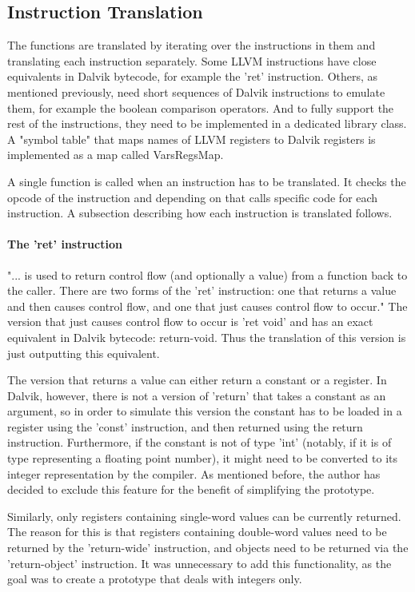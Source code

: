 \documentclass[parskip]{cs4rep}
\begin{document}
\subsection{Instruction Translation} \label{sec:instructionTranslation}

The functions are translated by iterating over the instructions in them and translating each instruction separately. Some LLVM instructions have close equivalents in Dalvik bytecode, for example the 'ret' instruction. Others, as mentioned previously, need short sequences of Dalvik instructions to emulate them, for example the boolean comparison operators. And to fully support the rest of the instructions, they need to be implemented in a dedicated library class. A "symbol table" that maps names of LLVM registers to Dalvik registers is implemented as a map called VarsRegsMap. 

A single function is called when an instruction has to be translated. It checks the opcode of the instruction and depending on that calls specific code for each instruction. A subsection describing how each instruction is translated follows.

\paragraph{The 'ret' instruction} "... is used to return control flow (and optionally a value) from a function back to the caller. There are two forms of the 'ret' instruction: one that returns a value and then causes control flow, and one that just causes control flow to occur."\cite{P11} The version that just causes control flow to occur is 'ret void' and has an exact equivalent in Dalvik bytecode: return-void. Thus the translation of this version is just outputting this equivalent.

The version that returns a value can either return a constant or a register. In Dalvik, however, there is not a version of 'return' that takes a constant as an argument, so in order to simulate this version the constant has to be loaded in a register using the 'const' instruction, and then returned using the return instruction. Furthermore, if the constant is not of type 'int' (notably, if it is of type representing a floating point number), it might need to be converted to its integer representation by the compiler. As mentioned before, the author has decided to exclude this feature for the benefit of simplifying the prototype.

Similarly, only registers containing single-word values can be currently returned. The reason for this is that registers containing double-word values need to be returned by the 'return-wide' instruction, and objects need to be returned via the 'return-object' instruction. It was unnecessary to add this functionality, as the goal was to create a prototype that deals with integers only.
\end{document}
